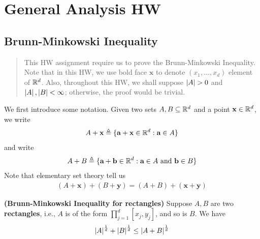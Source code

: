 \documentclass{report}
\begin{document}
\chapter{General Analysis HW}
\section{Brunn-Minkowski Inequality}
\begin{abstract}
  This HW assignment require us to prove the Brunn-Minkowski Inequality. Note that in this HW, we use bold face $\textbf{x}$ to denote $(x_1,\dots ,x_d)$ element of $\mathbb{R}^d$. Also, throughout this HW, we shall suppose $\abso{A}>0$ and $\left|A\right|,\left|B\right|<\infty$; otherwise, the proof would be trivial. 
\end{abstract}
\begin{mdframed}
  We first introduce some notation. Given two sets $A,B\subseteq \mathbb{R}^d$ and a point $\textbf{x}\in\mathbb{R}^d$, we write 
\begin{align*}
A+\textbf{x}\triangleq \{ \textbf{a}+\textbf{x}\in\mathbb{R}^d: \textbf{a} \in A \}
\end{align*}
and write 
\begin{align*}
A+B \triangleq \{ \textbf{a}+\textbf{b} \in\mathbb{R}^d: \textbf{a}\in A\text{ and }\textbf{b} \in  B \}
\end{align*}
Note that elementary set theory tell us 
\begin{align}
\label{trans}
  (A+\textbf{x})+(B+\textbf{y})=(A+B)+(\textbf{x}+\textbf{y})
\end{align}
\end{mdframed}
\begin{theorem}
\label{Brunn-Minkowski Inequality for Bricks}
\textbf{(Brunn-Minkowski Inequality for rectangles)} Suppose $A,B$ are two  \textbf{rectangles}, i.e., $A$ is of the form $\prod_{j=1}^d[x_j,y_j]$, and so is $B$. We have 
\begin{align*}
\left|A\right|^{\frac{1}{d}}+ \left|B\right|^{\frac{1}{d}}\leq \left|A+B\right|^{\frac{1}{d}}
\end{align*}
\end{theorem}
\end{document}
